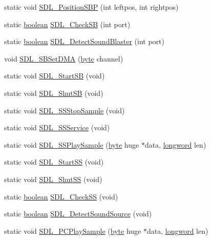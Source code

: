\begin{DoxyCompactItemize}
\item 
static void \hyperlink{ID__SD_8C_a39df2c8b2c24885f28dcebdda4db4062}{SDL\_\-PositionSBP} (int leftpos, int rightpos)
\item 
static \hyperlink{ID__HEAD_8H_a7c6368b321bd9acd0149b030bb8275ed}{boolean} \hyperlink{ID__SD_8C_a5425e51a77b3c1fcc2837766bf514933}{SDL\_\-CheckSB} (int port)
\item 
static \hyperlink{ID__HEAD_8H_a7c6368b321bd9acd0149b030bb8275ed}{boolean} \hyperlink{ID__SD_8C_aaabd0f719e3f77d97e06d7f8888dace7}{SDL\_\-DetectSoundBlaster} (int port)
\item 
void \hyperlink{ID__SD_8C_a5af19b40b692f6731aec85373fa70184}{SDL\_\-SBSetDMA} (\hyperlink{ID__HEAD_8H_a0c8186d9b9b7880309c27230bbb5e69d}{byte} channel)
\item 
static void \hyperlink{ID__SD_8C_ac8739ef15d834d9509ba1c34998c4e69}{SDL\_\-StartSB} (void)
\item 
static void \hyperlink{ID__SD_8C_ae4b2df23a45a69c1fc95b28f90b16161}{SDL\_\-ShutSB} (void)
\item 
static void \hyperlink{ID__SD_8C_a4b4cb4383cfa055401dc7ff4ff6f0104}{SDL\_\-SSStopSample} (void)
\item 
static void \hyperlink{ID__SD_8C_a3de2826da55134038984872d4df10fa6}{SDL\_\-SSService} (void)
\item 
static void \hyperlink{ID__SD_8C_ad99758f0e9faeac84caa0d153d36c9d1}{SDL\_\-SSPlaySample} (\hyperlink{ID__HEAD_8H_a0c8186d9b9b7880309c27230bbb5e69d}{byte} huge $\ast$data, \hyperlink{ID__HEAD_8H_a8a9a7dd50c6fdb45dcdf0eb929479663}{longword} len)
\item 
static void \hyperlink{ID__SD_8C_a7eb0e3e805cbe44878c2309c4333bdb7}{SDL\_\-StartSS} (void)
\item 
static void \hyperlink{ID__SD_8C_a0b2fcc77394b5931fe5e1cf3708345af}{SDL\_\-ShutSS} (void)
\item 
static \hyperlink{ID__HEAD_8H_a7c6368b321bd9acd0149b030bb8275ed}{boolean} \hyperlink{ID__SD_8C_a4efddc6ce316dcbf3faba8369ea72559}{SDL\_\-CheckSS} (void)
\item 
static \hyperlink{ID__HEAD_8H_a7c6368b321bd9acd0149b030bb8275ed}{boolean} \hyperlink{ID__SD_8C_a336af0952076adf1cc0fc9d3c38cc6f0}{SDL\_\-DetectSoundSource} (void)
\item 
static void \hyperlink{ID__SD_8C_a0b081a781f9a4e26ec9ce5939cad8601}{SDL\_\-PCPlaySample} (\hyperlink{ID__HEAD_8H_a0c8186d9b9b7880309c27230bbb5e69d}{byte} huge $\ast$data, \hyperlink{ID__HEAD_8H_a8a9a7dd50c6fdb45dcdf0eb929479663}{longword} len)

\end{DoxyCompactItemize}
